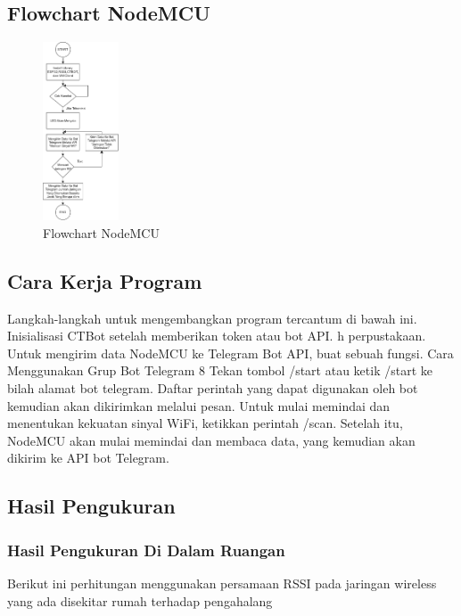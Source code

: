 \documentclass[conference]{IEEEtran}
\begin{document}
    \subsection{Flowchart NodeMCU}
    \begin{figure}[h]
        \centering
        \includegraphics[width=0.2\textwidth]{telegrambot.drawio.png}
        \caption{Flowchart NodeMCU}
    \end{figure}
    \vspace{1cm}
\subsection{Cara Kerja Program}
Langkah-langkah untuk mengembangkan program tercantum di bawah ini. Inisialisasi CTBot setelah memberikan token atau bot API. h perpustakaan. Untuk mengirim data NodeMCU ke Telegram Bot API, buat sebuah fungsi.
Cara Menggunakan Grup Bot Telegram 8 Tekan tombol /start atau ketik /start ke bilah alamat bot telegram. Daftar perintah yang dapat digunakan oleh bot kemudian akan dikirimkan melalui pesan.
Untuk mulai memindai dan menentukan kekuatan sinyal WiFi, ketikkan perintah /scan.
Setelah itu, NodeMCU akan mulai memindai dan membaca data, yang kemudian akan dikirim ke API bot Telegram.
    \subsection{Hasil Pengukuran}
    \subsubsection{Hasil Pengukuran Di Dalam Ruangan}
    Berikut ini perhitungan menggunakan persamaan RSSI 
    pada jaringan wireless yang ada disekitar rumah terhadap pengahalang
 
\end{document}

